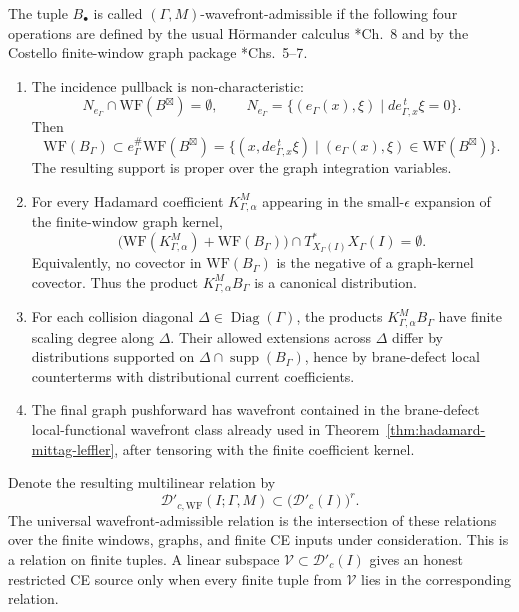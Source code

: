 \begin{defn}
  The tuple \(B_\bullet\) is called
  \((\Gamma,M)\)-wavefront-admissible if the following four operations are
  defined by the usual H\"ormander calculus
  \cite{hormander-vol1}*{Ch.~8} and by the Costello finite-window graph
  package \cite{costello-renormalization}*{Chs.~5--7}.
  \begin{enumerate}
    \item The incidence pullback is non-characteristic:
    \[
      N_{e_\Gamma}\cap\mathrm{WF}(B^\boxtimes)=\emptyset,\qquad
      N_{e_\Gamma}=
      \{(e_\Gamma(x),\xi)\mid de_{\Gamma,x}^{\,t}\xi=0\}.
    \]
    Then
    \[
      \mathrm{WF}(B_\Gamma)\subset
      e_\Gamma^\#\mathrm{WF}(B^\boxtimes)
      =
      \{(x,de_{\Gamma,x}^{\,t}\xi)\mid
      (e_\Gamma(x),\xi)\in\mathrm{WF}(B^\boxtimes)\}.
    \]
    The resulting support is proper over the graph integration variables.
    \item For every Hadamard coefficient
    \(K^M_{\Gamma,\alpha}\) appearing in the small-\(\epsilon\) expansion
    of the finite-window graph kernel,
    \[
      \bigl(
      \mathrm{WF}(K^M_{\Gamma,\alpha})
      +\mathrm{WF}(B_\Gamma)
      \bigr)
      \cap T^*_{X_\Gamma(I)}X_\Gamma(I)=\emptyset .
    \]
    Equivalently, no covector in
    \(\mathrm{WF}(B_\Gamma)\) is the negative of a graph-kernel covector.
    Thus the product \(K^M_{\Gamma,\alpha}B_\Gamma\) is a canonical
    distribution.
    \item For each collision diagonal
    \(\Delta\in\operatorname{Diag}(\Gamma)\), the products
    \(K^M_{\Gamma,\alpha}B_\Gamma\) have finite scaling degree along
    \(\Delta\).  Their allowed extensions across \(\Delta\) differ by
    distributions supported on
    \(\Delta\cap\operatorname{supp}(B_\Gamma)\), hence by brane-defect
    local counterterms with distributional current coefficients.
    \item The final graph pushforward has wavefront contained in the
    brane-defect local-functional wavefront class already used in
    Theorem~\ref{thm:hadamard-mittag-leffler}, after tensoring with the
    finite coefficient kernel.
  \end{enumerate}
  Denote the resulting multilinear relation by
  \[
    \mathcal D'_{c,\mathrm{WF}}(I;\Gamma,M)
      \subset \bigl(\mathcal D'_c(I)\bigr)^r .
  \]
  The universal wavefront-admissible relation is the intersection of
  these relations over the finite windows, graphs, and finite CE inputs
  under consideration.  This is a relation on finite tuples.  A linear
  subspace \(\mathcal V\subset\mathcal D'_c(I)\) gives an honest
  restricted CE source only when every finite tuple from \(\mathcal V\)
  lies in the corresponding relation.


\end{defn}
